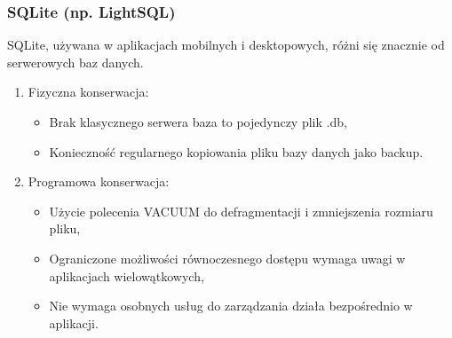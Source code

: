\documentclass[a4paper,11pt,openany,english]{sphinxmanual}
\begin{document}
\subsubsection{SQLite (np. LightSQL)}
\label{\detokenize{rozdzial2/Kontrola_i_konserwacja/kontrola_i_konserwacja:sqlite-np-lightsql}}
\sphinxAtStartPar
SQLite, używana w aplikacjach mobilnych i desktopowych, różni się znacznie od serwerowych baz danych.
\begin{enumerate}
%
\item {} 
\sphinxAtStartPar
Fizyczna konserwacja:
\begin{itemize}
\item {} 
\sphinxAtStartPar
Brak klasycznego serwera \textendash{} baza to pojedynczy plik .db,

\item {} 
\sphinxAtStartPar
Konieczność regularnego kopiowania pliku bazy danych jako backup.

\end{itemize}

\item {} 
\sphinxAtStartPar
Programowa konserwacja:
\begin{itemize}
\item {} 
\sphinxAtStartPar
Użycie polecenia VACUUM do defragmentacji i zmniejszenia rozmiaru pliku,

\item {} 
\sphinxAtStartPar
Ograniczone możliwości równoczesnego dostępu \textendash{} wymaga uwagi w aplikacjach wielowątkowych,

\item {} 
\sphinxAtStartPar
Nie wymaga osobnych usług do zarządzania \textendash{} działa bezpośrednio w aplikacji.

\end{itemize}

\end{enumerate}
\end{document}
